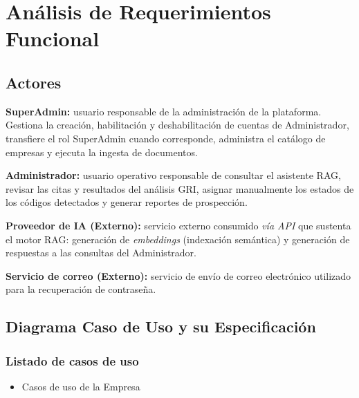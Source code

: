 \section{Análisis de Requerimientos Funcional}

\subsection{Actores}
\textbf{SuperAdmin:} usuario responsable de la administración de la plataforma. Gestiona la creación, habilitación y deshabilitación de cuentas de Administrador, transfiere el rol SuperAdmin cuando corresponde, administra el catálogo de empresas y ejecuta la ingesta de documentos.

\medskip
\textbf{Administrador:} usuario operativo responsable de consultar el asistente RAG, revisar las citas y resultados del análisis GRI, asignar manualmente los estados de los códigos detectados y generar reportes de prospección.

\medskip
\textbf{Proveedor de IA (Externo):} servicio externo consumido \emph{vía API} que sustenta el motor RAG: generación de \emph{embeddings} (indexación semántica) y generación de respuestas a las consultas del Administrador.

\medskip
\textbf{Servicio de correo (Externo):} servicio de envío de correo electrónico utilizado para la recuperación de contraseña.

\subsection{Diagrama Caso de Uso y su Especificación}

\subsubsection{Listado de casos de uso}
\begin{itemize}[leftmargin=1.4em,itemsep=2pt,topsep=2pt]
  \item Casos de uso de la Empresa
\end{itemize}

